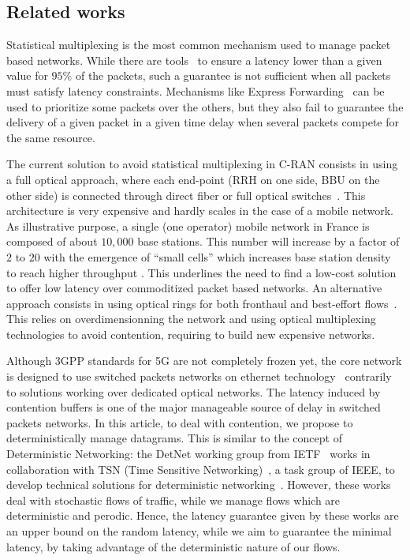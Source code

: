 \documentclass[a4paper,10pt]{journal}
\begin{document}
 \subsection*{Related works}

Statistical multiplexing is the most common mechanism used to manage packet based networks. While there are tools~\cite{metricsietf} to ensure a latency lower than a given value for $95\%$ of the packets, such a guarantee is not sufficient when all packets must satisfy latency constraints. Mechanisms like Express Forwarding~\cite{exprforw} can be used to prioritize some packets over the others, but they also fail to guarantee the delivery of a given packet in a given time delay when several packets compete for the same resource. 

The current solution to avoid statistical multiplexing in C-RAN consists in using a full optical approach, where each end-point (RRH on one side, BBU on the other side) is connected through direct fiber or full optical switches~\cite{kai2020amplify,tayq2017real}. This architecture is very expensive and hardly scales in the case of a mobile network. As illustrative purpose, a single (one operator) mobile network in France is composed of about $10,000$ base stations. This number will increase by a factor of $2$ to $20$ with the emergence of “small cells” which increases base station density to reach higher throughput \cite{dahlman20185g,romano2019imt}. This underlines the need to find a low-cost solution to offer low latency over commoditized packet based networks. 
An alternative approach consists in using optical rings for both fronthaul and best-effort flows~\cite{DBLP:conf/ondm/BarthGS19,rommel2020towards,luu2021dynamic}. This relies on overdimensionning the network and using optical multiplexing technologies to avoid contention, requiring to build new expensive networks.

Although 3GPP standards for 5G are not completely frozen yet, the core network is designed to use switched packets networks on ethernet technology~\cite{ieee1914,gomes2015fronthaul}
contrarily to solutions working over dedicated optical networks. The latency induced by contention buffers is one of the major manageable source of delay in switched packets networks. In this article, to deal with contention, we propose to deterministically manage datagrams. This is similar to the concept of Deterministic Networking: the DetNet working group from IETF~\cite{finn-detnet-architecture-08} works in collaboration with TSN (Time Sensitive Networking)~\cite{ieee802}, a task group of IEEE, to develop technical solutions for deterministic networking~\cite{bhattacharjee2020time,8613095,durr2016no}. However, these works deal with stochastic flows of traffic, while we manage flows which are deterministic and perodic. Hence, the latency guarantee given by these works are an upper bound on the random latency, while we aim to guarantee the minimal latency, by taking advantage of the deterministic nature of our flows. %
\end{document}
